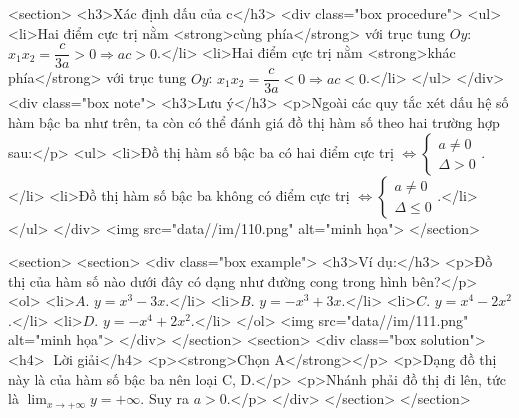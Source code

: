     <section>
        <h3>Xác định dấu của c</h3>
        <div class="box procedure">
            <ul>
                <li>Hai điểm cực trị nằm <strong>cùng phía</strong> với trục tung \(Oy\): \(x_1x_2 = \dfrac{c}{3a} > 0 \Rightarrow \boxed{ac > 0}\).</li>
                <li>Hai điểm cực trị nằm <strong>khác phía</strong> với trục tung \(Oy\): \(x_1x_2 = \dfrac{c}{3a} < 0 \Rightarrow \boxed{ac < 0}\).</li>
            </ul>
        </div>
        <div class="box note">
            <h3>Lưu ý</h3>
            <p>Ngoài các quy tắc xét dấu hệ số hàm bậc ba như trên, ta còn có thể đánh giá đồ thị hàm số theo hai trường hợp sau:</p>
            <ul>
                <li>Đồ thị hàm số bậc ba có hai điểm cực trị \(\Leftrightarrow \begin{cases} a \ne 0 \\ \Delta > 0 \end{cases}\).</li>
                <li>Đồ thị hàm số bậc ba không có điểm cực trị \(\Leftrightarrow \begin{cases} a \ne 0 \\ \Delta \le 0 \end{cases}\).</li>
            </ul>
        </div>
        <img src="data//im/110.png" alt="minh họa">
    </section>

    <section>
        <section>
            <div class="box example">
                <h3>Ví dụ:</h3>
                <p>Đồ thị của hàm số nào dưới đây có dạng như đường cong trong hình bên?</p>
                <ol>
                    <li>\(A.\) \(y = x^3 - 3x\).</li>
                    <li>\(B.\) \(y = -x^3 + 3x\).</li>
                    <li>\(C.\) \(y = x^4 - 2x^2\).</li>
                    <li>\(D.\) \(y = -x^4 + 2x^2\).</li>
                </ol>
                <img src="data//im/111.png" alt="minh họa">
            </div>
        </section>
        <section>
            <div class="box solution">
                <h4>📝 Lời giải</h4>
                <p><strong>Chọn A</strong></p>
                <p>Dạng đồ thị này là của hàm số bậc ba nên loại C, D.</p>
                <p>Nhánh phải đồ thị đi lên, tức là \(\lim_{x \to +\infty} y = +\infty\). Suy ra \(a>0\).</p>
            </div>
        </section>
    </section>

